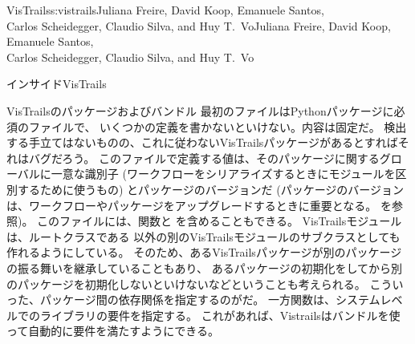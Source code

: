 \begin{aosachaptertoc}{VisTrails}{s:vistrails}{Juliana Freire, David Koop, Emanuele Santos, \\ Carlos Scheidegger, Claudio Silva, and Huy T.\ Vo}{Juliana Freire, David Koop, Emanuele Santos, \\ \hspace*{0.9cm} Carlos Scheidegger, Claudio Silva, and Huy T.\ Vo}
\begin{aosasect1}{インサイドVisTrails}
\begin{aosasect2}{VisTrailsのパッケージおよびバンドル}
最初のファイルはPythonパッケージに必須のファイルで、
いくつかの定義を書かないといけない。内容は固定だ。
検出する手立てはないものの、これに従わないVisTrailsパッケージがあるとすればそれはバグだろう。
このファイルで定義する値は、そのパッケージに関するグローバルに一意な識別子
(ワークフローをシリアライズするときにモジュールを区別するために使うもの)
とパッケージのバージョンだ
(パッケージのバージョンは、ワークフローやパッケージをアップグレードするときに重要となる。
を参照)。
このファイルには、関数と
を含めることもできる。
VisTrailsモジュールは、ルートクラスである
以外の別のVisTrailsモジュールのサブクラスとしても作れるようにしている。
そのため、あるVisTrailsパッケージが別のパッケージの振る舞いを継承していることもあり、
あるパッケージの初期化をしてから別のパッケージを初期化しないといけないなどということも考えられる。
こういった、パッケージ間の依存関係を指定するのがだ。
一方関数は、システムレベルでのライブラリの要件を指定する。
これがあれば、Vistrailsはバンドルを使って自動的に要件を満たすようにできる。


\end{aosasect2}
\end{aosasect1}
\end{aosachaptertoc}
